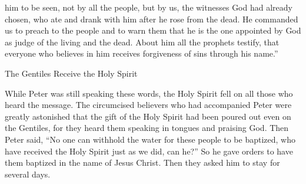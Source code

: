 {him
to be
seen,
not
by all
the people,
but
by
us,
the witnesses
God
had already chosen,
who
ate
and
drank
with him
after
he rose
from
the dead.
He
commanded
us
to preach
to the people
and
to warn
them that
he
is
the one appointed
by
God
as judge
of
the living
and
the dead.
About him
all
the prophets
testify,
that everyone
who believes
in
him
receives
forgiveness
of sins
through
his
name.”
\par }{\SH The Gentiles Receive the Holy Spirit
\par }{\PP {}While Peter
was
still
speaking
these
words,
the Holy
Spirit
fell
on
all
those who heard
the message.
The circumcised
believers
who had accompanied
Peter
were greatly astonished
that
the gift
of the Holy
Spirit
had been poured out
even
on
the Gentiles,
for
they heard
them
speaking
in tongues
and
praising
God.
Then
Peter
said,
“No one can
withhold
the water
for these people to be baptized,
who
have received
the Holy
Spirit
just as
we did, can he?”
So
he gave orders
to have
them
baptized
in
the name
of Jesus
Christ.
Then
they asked
him
to stay
for several
days.

}
